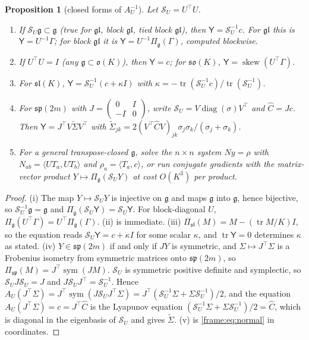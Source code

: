 \documentclass[11pt]{article}
\newtheorem{proposition}[theorem]{Proposition}
\theoremstyle{definition}
\theoremstyle{remark}
\providecommand{\gl}{\mathfrak{gl}}
\providecommand{\tr}{\operatorname{tr}}
\providecommand{\g}{\mathfrak{g}}
\providecommand{\sym}{\operatorname{sym}}
\providecommand{\ip}[2]{\langle #1, #2\rangle}
\begin{document}
\begin{proposition}[closed forms of $A_U^{-1}$]\label{frame:prop:closed}
Let $\mathcal{S}_U=U^\top U$.
\begin{enumerate}
\item[(i)] If $\mathcal{S}_U\g\subset\g$ (true for $\gl$, block $\gl$, tied block $\gl$), then $\mathsf{Y}=\mathcal{S}_U^{-1}c$. For $\gl$ this is $\mathsf{Y}=U^{-1}\Gamma$; for block $\gl$ it is $\mathsf{Y}=U^{-1}\Pi_\g(\Gamma)$, computed blockwise.
\item[(ii)] If $U^\top U=I$ (any $\g\subset\mathfrak{o}(K)$), then $\mathsf{Y}=c$; for $\mathfrak{so}(K)$, $\mathsf{Y}=\operatorname{skew}(U^\top\Gamma)$.
\item[(iii)] For $\mathfrak{sl}(K)$, $\mathsf{Y}=\mathcal{S}_U^{-1}(c+\kappa I)$ with $\kappa=-\tr(\mathcal{S}_U^{-1}c)/\tr(\mathcal{S}_U^{-1})$.
\item[(iv)] For $\mathfrak{sp}(2m)$ with $J=\begin{pmatrix}0&I\\-I&0\end{pmatrix}$, write $\mathcal{S}_U=V\operatorname{diag}(\sigma)V^\top$ and $\hat C=Jc$. Then $\mathsf{Y}=J^\top V\tilde\Sigma V^\top$ with $\tilde\Sigma_{jk}=2(V^\top\hat CV)_{jk}\sigma_j\sigma_k/(\sigma_j+\sigma_k)$.
\item[(v)] For a general transpose-closed $\g$, solve the $n\times n$ system $Ny=\rho$ with $N_{ab}=\ip{UT_a}{UT_b}$ and $\rho_a=\ip{T_a}{c}$, or run conjugate gradients with the matrix-vector product $Y\mapsto\Pi_\g(\mathcal{S}_UY)$ at cost $O(K^3)$ per product.
\end{enumerate}
\end{proposition}
\begin{proof}
(i) The map $Y\mapsto\mathcal{S}_UY$ is injective on $\g$ and maps $\g$ into $\g$, hence bijective, so $\mathcal{S}_U^{-1}\g=\g$ and $\Pi_\g(\mathcal{S}_U\mathsf{Y})=\mathcal{S}_U\mathsf{Y}$. For block-diagonal $U$, $\Pi_\g(U^\top\Gamma)=U^\top\Pi_\g(\Gamma)$. (ii) is immediate. (iii) $\Pi_{\mathfrak{sl}}(M)=M-(\tr M/K)I$, so the equation reads $\mathcal{S}_U\mathsf{Y}=c+\kappa I$ for some scalar $\kappa$, and $\tr\mathsf{Y}=0$ determines $\kappa$ as stated. (iv) $Y\in\mathfrak{sp}(2m)$ if and only if $JY$ is symmetric, and $\Sigma\mapsto J^\top\Sigma$ is a Frobenius isometry from symmetric matrices onto $\mathfrak{sp}(2m)$, so $\Pi_{\mathfrak{sp}}(M)=J^\top\sym(JM)$. $\mathcal{S}_U$ is symmetric positive definite and symplectic, so $\mathcal{S}_UJ\mathcal{S}_U=J$ and $J\mathcal{S}_UJ^\top=\mathcal{S}_U^{-1}$. Hence $A_U(J^\top\Sigma)=J^\top\sym(J\mathcal{S}_UJ^\top\Sigma)=J^\top(\mathcal{S}_U^{-1}\Sigma+\Sigma\mathcal{S}_U^{-1})/2$, and the equation $A_U(J^\top\Sigma)=c=J^\top\hat C$ is the Lyapunov equation $(\mathcal{S}_U^{-1}\Sigma+\Sigma\mathcal{S}_U^{-1})/2=\hat C$, which is diagonal in the eigenbasis of $\mathcal{S}_U$ and gives $\tilde\Sigma$. (v) is \eqref{frame:eq:normal} in coordinates.
\end{proof}
\end{document}
